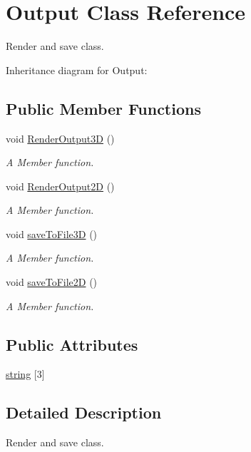 \hypertarget{classOutput}{}\section{Output Class Reference}
\label{classOutput}


Render and save class.  




Inheritance diagram for Output\+:
\subsection*{Public Member Functions}
\begin{DoxyCompactItemize}
\item 
void \hyperlink{classOutput_a50c6da843dbf27d6238ed07082b31839}{Render\+Output3D} ()
\begin{DoxyCompactList}\small\item\em A Member function. \end{DoxyCompactList}\item 
void \hyperlink{classOutput_a9766c258cad838c5779e0abc778a530d}{Render\+Output2D} ()
\begin{DoxyCompactList}\small\item\em A Member function. \end{DoxyCompactList}\item 
void \hyperlink{classOutput_aa16a2893d743f7c218c026efa3e65718}{save\+To\+File3D} ()
\begin{DoxyCompactList}\small\item\em A Member function. \end{DoxyCompactList}\item 
void \hyperlink{classOutput_aa9ea0df4774ce32a319bdb1b3a6712a8}{save\+To\+File2D} ()
\begin{DoxyCompactList}\small\item\em A Member function. \end{DoxyCompactList}\end{DoxyCompactItemize}
\subsection*{Public Attributes}
\begin{DoxyCompactItemize}
\item 
\hyperlink{classOutput_afb80842d973398a94444913d2c9167d3}{string} \mbox{[}3\mbox{]}
\end{DoxyCompactItemize}


\subsection{Detailed Description}
Render and save class. 

